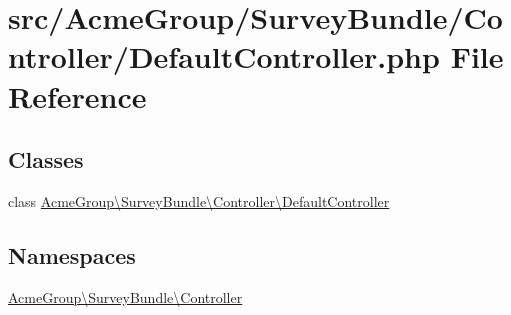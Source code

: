 \hypertarget{_default_controller_8php}{\section{src/\+Acme\+Group/\+Survey\+Bundle/\+Controller/\+Default\+Controller.php File Reference}
\label{_default_controller_8php}
}
\subsection*{Classes}
\begin{DoxyCompactItemize}
\item 
class \hyperlink{class_acme_group_1_1_survey_bundle_1_1_controller_1_1_default_controller}{Acme\+Group\textbackslash{}\+Survey\+Bundle\textbackslash{}\+Controller\textbackslash{}\+Default\+Controller}
\end{DoxyCompactItemize}
\subsection*{Namespaces}
\begin{DoxyCompactItemize}
\item 
 \hyperlink{namespace_acme_group_1_1_survey_bundle_1_1_controller}{Acme\+Group\textbackslash{}\+Survey\+Bundle\textbackslash{}\+Controller}
\end{DoxyCompactItemize}

